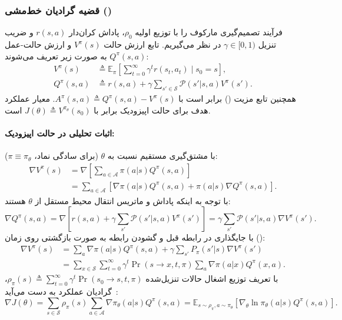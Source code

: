 \subsubsection*{قضیه گرادیان خط‌مشی ()}
فرآیند تصمیم‌گیری مارکوف را با توزیع اولیه $\rho_0$، پاداش کران‌دار $r(s,a)$ و ضریب تنزیل $\gamma \in [0, 1)$ در نظر می‌گیریم. تابع ارزش حالت $V^\pi(s)$ و ارزش حالت-عمل $Q^\pi(s,a)$ به صورت زیر تعریف می‌شوند:
\begin{align}
V^\pi(s) &\triangleq \mathbb{E}_{\pi} \left[ \sum_{t=0}^\infty \gamma^t r(s_t, a_t) \;\Bigg|\; s_0 = s \right], \\
Q^\pi(s, a) &\triangleq r(s, a) + \gamma \sum_{s' \in \mathcal{S}} \mathcal{P}(s'|s, a) V^\pi(s').
\end{align}
همچنین تابع مزیت () برابر است با $A^\pi(s, a) \triangleq Q^\pi(s, a) - V^\pi(s)$. معیار عملکرد هدف برای حالت اپیزودیک برابر با $J(\theta) \triangleq V^{\pi_\theta}(s_0)$ است.

\paragraph*{اثبات تحلیلی در حالت اپیزودیک:}
با مشتق‌گیری مستقیم نسبت به $\theta$ (برای سادگی نماد، $\pi \equiv \pi_\theta$):
\begin{align}
\nabla V^\pi(s) &= \nabla \left[ \sum_{a \in \mathcal{A}} \pi(a|s) Q^\pi(s, a) \right] \nonumber \\
&= \sum_{a \in \mathcal{A}} \left[ \nabla \pi(a|s) Q^\pi(s, a) + \pi(a|s) \nabla Q^\pi(s, a) \right].
\end{align}
با توجه به اینکه پاداش و ماتریس انتقال محیط مستقل از $\theta$ هستند:
\begin{equation}
\nabla Q^\pi(s, a) = \nabla \left[ r(s, a) + \gamma \sum_{s'} \mathcal{P}(s'|s, a) V^\pi(s') \right] = \gamma \sum_{s'} \mathcal{P}(s'|s, a) \nabla V^\pi(s').
\end{equation}
با جایگذاری در رابطه قبل و گشودن رابطه به صورت بازگشتی روی زمان ():
\begin{align}
\nabla V^\pi(s) &= \sum_{a} \nabla \pi(a|s) Q^\pi(s, a) + \gamma \sum_{s'} P_\pi(s'|s) \nabla V^\pi(s') \nonumber \\
&= \sum_{x \in \mathcal{S}} \sum_{t=0}^\infty \gamma^t \Pr(s \to x, t, \pi) \sum_{a} \nabla \pi(a|x) Q^\pi(x, a).
\end{align}
با تعریف توزیع اشغال حالات تنزیل‌شده $\rho_\pi(s) \triangleq \sum_{t=0}^\infty \gamma^t \Pr(s_0 \to s, t, \pi)$، گرادیان عملکرد به دست می‌آید~\cite{sutton2000policy}:
\begin{equation}
\nabla J(\theta) = \sum_{s \in \mathcal{S}} \rho_\pi(s) \sum_{a \in \mathcal{A}} \nabla \pi_\theta(a|s) Q^\pi(s, a) = \mathbb{E}_{s \sim \rho_\pi, a \sim \pi_\theta} \left[ \nabla_\theta \ln \pi_\theta(a|s) Q^\pi(s, a) \right].
\end{equation}

